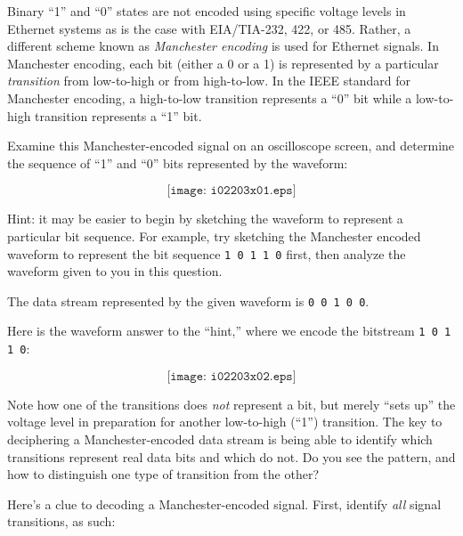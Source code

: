 

Binary ``1'' and ``0'' states are not encoded using specific voltage levels in Ethernet systems as is the case with EIA/TIA-232, 422, or 485.  Rather, a different scheme known as {\it Manchester encoding} is used for Ethernet signals.  In Manchester encoding, each bit (either a 0 or a 1) is represented by a particular {\it transition} from low-to-high or from high-to-low.  In the IEEE standard for Manchester encoding, a high-to-low transition represents a ``0'' bit while a low-to-high transition represents a ``1'' bit.

Examine this Manchester-encoded signal on an oscilloscope screen, and determine the sequence of ``1'' and ``0'' bits represented by the waveform:

$$\texttt{[image: i02203x01.eps]}$$

\vskip 10pt

Hint: it may be easier to begin by sketching the waveform to represent a particular bit sequence.  For example, try sketching the Manchester encoded waveform to represent the bit sequence {\tt 1 0 1 1 0} first, then analyze the waveform given to you in this question.







The data stream represented by the given waveform is {\tt 0 0 1 0 0}.

\vskip 10pt

Here is the waveform answer to the ``hint,'' where we encode the bitstream {\tt 1 0 1 1 0}:

$$\texttt{[image: i02203x02.eps]}$$

Note how one of the transitions does {\it not} represent a bit, but merely ``sets up'' the voltage level in preparation for another low-to-high (``1'') transition.  The key to deciphering a Manchester-encoded data stream is being able to identify which transitions represent real data bits and which do not.  Do you see the pattern, and how to distinguish one type of transition from the other?

\filbreak

Here's a clue to decoding a Manchester-encoded signal.  First, identify {\it all} signal transitions, as such:

